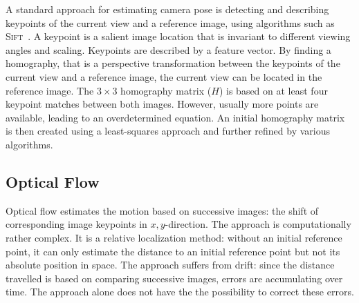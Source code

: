 A standard approach for estimating camera pose is detecting and
describing keypoints of the current view and a reference image, using
algorithms such as \textsc{Sift}~\cite{lowe1999object}. A
keypoint is a salient image location that is invariant to different
viewing angles and scaling. Keypoints are described by a feature vector. By finding a homography, that is a perspective transformation between the keypoints of the current view and a reference image, the current view can be located in the reference image. The $3 \times 3$
homography matrix ($H$) is based on at least four keypoint matches
between both images. However, usually more points are available,
leading to an overdetermined equation. An initial homography matrix is
then created using a least-squares approach and further refined by
various algorithms.


\subsection{Optical Flow}
\label{sec:opticalflow}

Optical flow estimates the motion based on successive images: the shift of corresponding image keypoints in $x,y$-direction.
The approach is computationally rather complex. It is a relative localization method: without an initial reference point, it can only estimate the distance to an initial reference point but not its absolute position in space. The approach suffers from drift: since the distance travelled is based on comparing successive images, errors are accumulating over time. The approach alone does not have the  the possibility to correct these errors.
